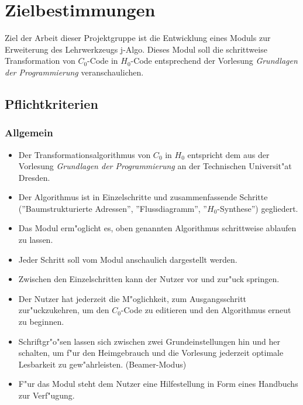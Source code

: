 ﻿\section{Zielbestimmungen}
Ziel der Arbeit dieser Projektgruppe ist die Entwicklung eines Moduls zur
Erweiterung des Lehrwerkzeugs j-Algo. Dieses Modul soll die schrittweise
Transformation von $C_0$-Code in $H_0$-Code entsprechend der Vorlesung
\textit{Grundlagen der Programmierung} veranschaulichen.

\subsection{Pflichtkriterien}

\begin{itemize}
	\subsubsection{Allgemein}
	\begin{itemize}
    \item Der Transformationsalgorithmus von $C_0$ in $H_0$ entspricht dem aus
    der Vorlesung \textit{Grundlagen der Programmierung} an der Technischen
    Universit"at Dresden.
    \item Der Algorithmus ist in Einzelschritte und zusammenfassende Schritte (''Baumstrukturierte Adressen'', ''Flussdiagramm'', ''$H_0$-Synthese'')
    gegliedert.
    \item Das Modul erm"oglicht es, oben genannten Algorithmus schrittweise
    ablaufen zu lassen.
    \item Jeder Schritt soll vom Modul anschaulich dargestellt werden.
    \item Zwischen den Einzelschritten kann der Nutzer vor und zur"uck
    springen.
    \item Der Nutzer hat jederzeit die M"oglichkeit, zum Ausgangsschritt
    zur"uckzukehren, um den $C_0$-Code zu editieren und den Algorithmus
    erneut zu beginnen.
		\item Schriftgr"o"sen lassen sich zwischen zwei Grundeinstellungen hin und her schalten,
		um f"ur den Heimgebrauch und die Vorlesung jederzeit optimale Lesbarkeit zu gew"ahrleisten. (Beamer-Modus)
    \item F"ur das Modul steht dem Nutzer eine Hilfestellung in Form eines
    Handbuchs zur Verf"ugung.
	\end{itemize}


\end{itemize}
